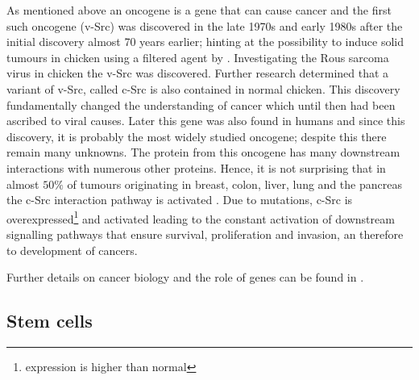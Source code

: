 As mentioned above an oncogene is a gene that can cause cancer and the first such oncogene (v-Src) was discovered in the late 1970s and early 1980s \cite{Martin:2001jx} after the initial discovery almost 70 years earlier; hinting at the possibility to induce solid tumours in chicken using a filtered agent by \cite{Rous:1911uf}. Investigating the Rous sarcoma virus in chicken the v-Src was discovered. Further research determined that a variant of v-Src, called c-Src is also contained in normal chicken. This discovery  fundamentally changed the understanding of cancer which until then had been ascribed to  viral causes. Later this gene was also found in humans and since this discovery, it is probably the most widely studied oncogene; despite this there remain many unknowns. The protein from this oncogene has many downstream interactions with numerous other proteins. Hence, it is not surprising that in almost $50\%$ of tumours originating in breast, colon, liver, lung and the pancreas the c-Src interaction pathway is activated \cite{Dehm:2013fr}. Due to mutations, c-Src is overexpressed\footnote{expression is higher than normal} and activated leading to the constant activation of downstream signalling pathways that ensure survival, proliferation and invasion, an therefore to development of cancers.

Further details on cancer biology and the role of genes can be found in \cite{Weinberg:2013uu}.

\subsection{Stem cells}
\label{sec:stem-cells}

